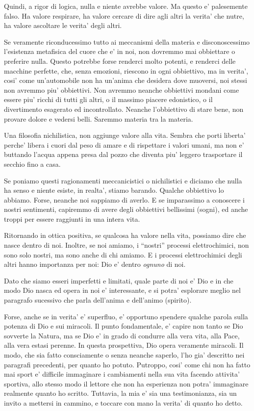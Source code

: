 Quindi, a rigor di logica, nulla e niente avrebbe valore. Ma questo e' palesemente falso. Ha valore respirare, ha valore cercare di dire agli altri la verita' che nutre, ha valore ascoltare le verita' degli altri.

Se veramente riconducessimo tutto ai meccanismi della materia e disconoscessimo l'esistenza metafisica del cuore che e' in noi, non dovremmo mai obbiettare o preferire nulla. 
Questo potrebbe forse renderci molto potenti, e renderci delle macchine perfette, che, senza emozioni, riescono in ogni obbiettivo, ma in verita', cosi' come un'automobile non ha un'anima che desidera dove muoversi, noi stessi non avremmo piu' obbiettivi. Non avremmo neanche obbiettivi mondani come essere piu' ricchi di tutti gli altri, o il massimo piacere edonistico, o il divertimento esagerato ed incontrollato. Neanche l'obbiettivo di stare bene, non provare dolore e vedersi belli. Saremmo materia tra la materia.

Una filosofia nichilistica, non aggiunge valore alla vita. Sembra che porti liberta' perche' libera i cuori dal peso di amare e di rispettare i valori umani, ma non e' buttando l'acqua appena presa dal pozzo che diventa piu' leggero trasportare il secchio fino a casa.

Se poniamo questi ragionamenti meccanicistici o nichilistici e diciamo che nulla ha senso e niente esiste, in realta', stiamo barando. Qualche obbiettivo lo abbiamo. Forse, neanche noi sappiamo di averlo. E se imparassimo a conoscere i nostri sentimenti, capiremmo di avere degli obbiettivi bellissimi (sogni), ed anche troppi per essere raggiunti in una intera vita.

Ritornando in ottica positiva, se qualcosa ha valore nella vita, possiamo dire che nasce dentro di noi. Inoltre, se noi amiamo, i ``nostri'' processi elettrochimici, non sono solo nostri, ma sono anche di chi amiamo. E i processi elettrochimici degli altri hanno importanza per noi: Dio e' dentro \emph{ognuno} di noi.

Dato che siamo esseri imperfetti e limitati, quale parte di noi e' Dio e in che modo Dio nasca ed opera in noi e' interessante, e si potra' esplorare meglio nel paragrafo sucessivo che parla dell'anima e dell'animo (spirito).

Forse, anche se in verita' e' superfluo, e' opportuno spendere qualche parola sulla potenza di Dio e sui miracoli. Il punto fondamentale, e' capire non tanto se Dio sovverte la Natura, ma se Dio e' in grado di condurre alla vera vita, alla Pace, alla vera estasi perenne. In questa prospettiva, Dio opera veramente miracoli. Il modo, che sia fatto consciamente o senza neanche saperlo, l'ho gia' descritto nei paragrafi precedenti, per quanto ho potuto. Putroppo, cosi' come chi non ha fatto mai sport e' difficile immaginare i cambiamenti nella sua vita facendo attivita' sportiva, allo stesso modo il lettore che non ha esperienza non potra' immaginare realmente quanto ho scritto. Tuttavia, la mia e' sia una testimonianza, sia un invito a mettersi in cammino, e toccare con mano la verita' di quanto ho detto.

